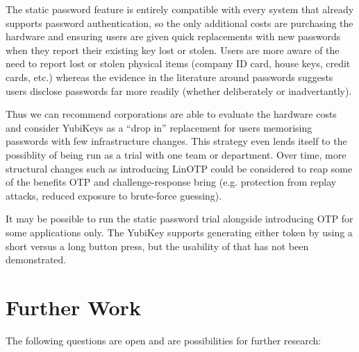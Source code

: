 \documentclass{report}
\begin{document}
The static password feature is entirely compatible with every system that already
supports password authentication, so the only additional costs are purchasing
the hardware and ensuring users are given quick replacements with new passwords
when they report their existing key lost or stolen. Users are more aware of the
need to report lost or stolen physical items (company ID card, house keys, credit cards, etc.)
whereas the evidence in the literature around passwords suggests users disclose
passwords far more readily (whether deliberately or inadvertantly).

Thus we can recommend corporations are able to evaluate the hardware costs
and consider YubiKeys as a ``drop in'' replacement for users memorising
passwords with few infrastructure changes. This strategy even lends itself
to the possiblity of being run as a trial with one team or department. Over time,
more structural changes such as introducing LinOTP could be considered to
reap some of the benefits OTP and challenge-response bring (e.g. protection
from replay attacks, reduced exposure to brute-force guessing).

It may be possible to run the static password trial alongside introducing OTP
for some applications only. The YubiKey supports generating either token
by using a short versus a long button press, but the usability of that has
not been demonstrated.

\chapter{Further Work}

The following questions are open and are possibilities for further research:
\end{document}
